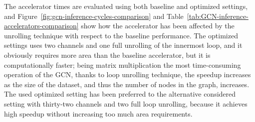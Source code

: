 The accelerator times are evaluated using both baseline and optimized settings, and Figure~\ref{fig:gcn-inference-cycles-comparison} and Table~\ref{tab:GCN-inference-accelerators-comparison} show how the accelerator has been affected by the unrolling technique with respect to the baseline performance.
The optimized settings uses two channels and one full unrolling of the innermost loop, and it obviously requires more area than the baseline accelerator, but it is computationally faster; being matrix multiplication the most time-consuming operation of the GCN, thanks to loop unrolling technique, the speedup increases as the size of the dataset, and thus the number of nodes in the graph, increases.
The used optimized setting has been preferred to the alternative considered setting with thirty-two channels and two full loop unrolling, because it achieves high speedup without increasing too much area requirements.

